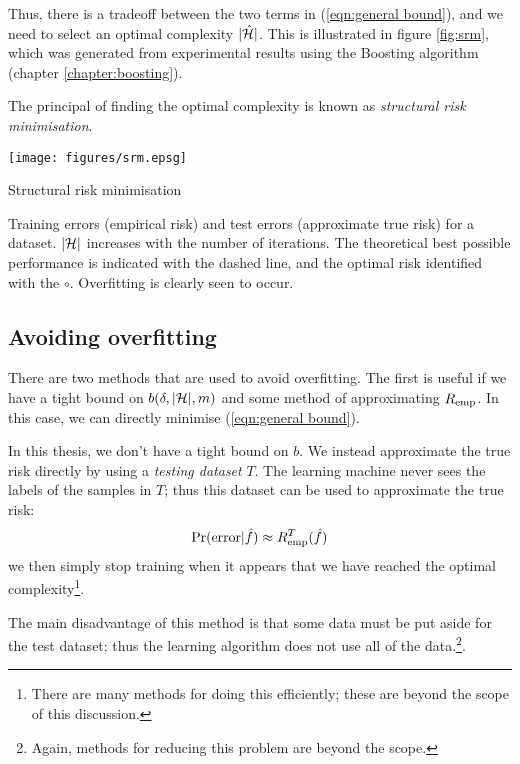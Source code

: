 Thus, there is a tradeoff between the two terms in (\ref{eqn:general
bound}), and we need to select an optimal complexity $|\hat{\mathcal{H}}|$.
This is illustrated in figure \ref{fig:srm}, which was generated from
experimental results using the Boosting algorithm (chapter
\ref{chapter:boosting}).

The principal of finding the optimal complexity is known as
\emph{structural risk minimisation}.

\begin{linefigure}
\begin{center}
\texttt{[image: figures/srm.epsg]}
\end{center}
\caption{Structural risk minimisation}
Training errors (empirical risk) and test errors (approximate true
risk) for a dataset.  $|\mathcal{H}|$ increases with the number of
iterations.  The theoretical best possible performance is
indicated with the dashed line, and the optimal risk identified with
the $\circ$.  Overfitting is clearly seen to occur.
\label{fig:overfitting}
\end{linefigure}

\subsection{Avoiding overfitting}

There are two methods that are used to avoid overfitting.  The first
is useful if we have a tight bound on $b(\delta, |\mathcal{H}|, m)$ and some
method of approximating $R_{\mathrm{emp}}$.  In this case, we can directly
minimise (\ref{eqn:general bound}).

In this thesis, we don't have a tight bound on $b$.  We instead
approximate the true risk directly by using a \emph{testing dataset}
$T$.  The learning machine never sees the labels of the samples in
$T$; thus this dataset can be used to approximate the true risk:
%
\begin{equation}
\Pr(\mathrm{error}|\hat{f}) \approx R_{\mathrm{emp}}^{T}(\hat{f})
\end{equation}
%
we then simply stop training when it appears that we have reached the
optimal complexity\footnote{There are many methods for doing this efficiently;
these are beyond the scope of this discussion.}.

The main disadvantage of this method is that some data must be put
aside for the test dataset; thus the learning algorithm does not use
all of the data.\footnote{Again, methods for reducing this problem are
beyond the scope.}.

